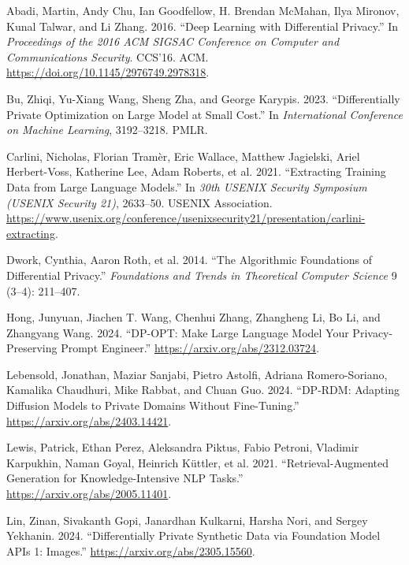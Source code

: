 \documentclass[
  12pt,
  a4paper,
]{article}
\newlength{\cslhangindent}
\newenvironment{CSLReferences}[2] %
 {\begin{list}{}{%
  \setlength{\itemindent}{0pt}
  \setlength{\leftmargin}{0pt}
  \setlength{\parsep}{0pt}
  \ifodd #1
   \setlength{\leftmargin}{\cslhangindent}
   \setlength{\itemindent}{-1\cslhangindent}
  \fi
  \setlength{\itemsep}{#2\baselineskip}}}
 {\end{list}}
\begin{document}
\label{refs}
\begin{CSLReferences}{1}{0}
Abadi, Martin, Andy Chu, Ian Goodfellow, H. Brendan McMahan, Ilya
Mironov, Kunal Talwar, and Li Zhang. 2016. {``Deep Learning with
Differential Privacy.''} In \emph{Proceedings of the 2016 ACM SIGSAC
Conference on Computer and Communications Security}. CCS'16. ACM.
\url{https://doi.org/10.1145/2976749.2978318}.

Bu, Zhiqi, Yu-Xiang Wang, Sheng Zha, and George Karypis. 2023.
{``Differentially Private Optimization on Large Model at Small Cost.''}
In \emph{International Conference on Machine Learning}, 3192--3218.
PMLR.

Carlini, Nicholas, Florian Tramèr, Eric Wallace, Matthew Jagielski,
Ariel Herbert-Voss, Katherine Lee, Adam Roberts, et al. 2021.
{``Extracting Training Data from Large Language Models.''} In \emph{30th
USENIX Security Symposium (USENIX Security 21)}, 2633--50. USENIX
Association.
\url{https://www.usenix.org/conference/usenixsecurity21/presentation/carlini-extracting}.

Dwork, Cynthia, Aaron Roth, et al. 2014. {``The Algorithmic Foundations
of Differential Privacy.''} \emph{Foundations and
Trends{\textregistered} in Theoretical Computer Science} 9 (3--4):
211--407.

Hong, Junyuan, Jiachen T. Wang, Chenhui Zhang, Zhangheng Li, Bo Li, and
Zhangyang Wang. 2024. {``DP-OPT: Make Large Language Model Your
Privacy-Preserving Prompt Engineer.''}
\url{https://arxiv.org/abs/2312.03724}.

Lebensold, Jonathan, Maziar Sanjabi, Pietro Astolfi, Adriana
Romero-Soriano, Kamalika Chaudhuri, Mike Rabbat, and Chuan Guo. 2024.
{``DP-RDM: Adapting Diffusion Models to Private Domains Without
Fine-Tuning.''} \url{https://arxiv.org/abs/2403.14421}.

Lewis, Patrick, Ethan Perez, Aleksandra Piktus, Fabio Petroni, Vladimir
Karpukhin, Naman Goyal, Heinrich Küttler, et al. 2021.
{``Retrieval-Augmented Generation for Knowledge-Intensive NLP Tasks.''}
\url{https://arxiv.org/abs/2005.11401}.

Lin, Zinan, Sivakanth Gopi, Janardhan Kulkarni, Harsha Nori, and Sergey
Yekhanin. 2024. {``Differentially Private Synthetic Data via Foundation
Model APIs 1: Images.''} \url{https://arxiv.org/abs/2305.15560}.


\end{CSLReferences}
\end{document}
